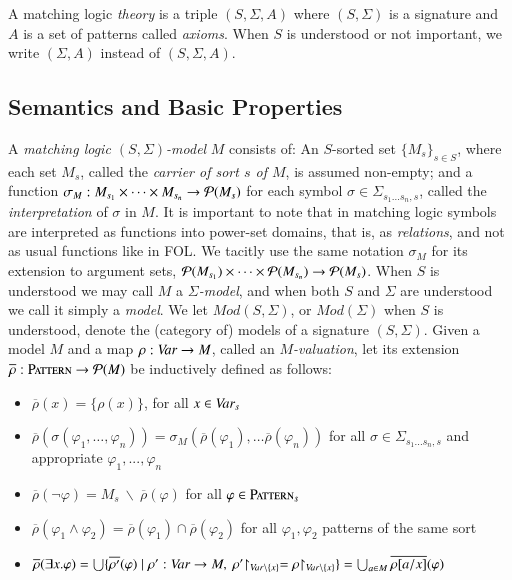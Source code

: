 \documentclass[UTF8,11pt]{article}
\theoremstyle{plain}
\theoremstyle{definition}
\theoremstyle{remark}
\newcommand{\Mod}{\textit{Mod}}
\newcommand{\Pattern}{\textsc{Pattern}\xspace}
\begin{document}
A matching logic \emph{theory} is a triple $(S, \Sigma, A)$ where
$(S,\Sigma)$ is a signature and $A$ is a set of patterns called \emph{axioms}.
When $S$ is understood or not important, we write $(\Sigma,A)$ instead of $(S,\Sigma,A)$.

\subsection{Semantics and Basic Properties}
\label{sec:semantics}

A \emph{matching logic $(S,\Sigma)$-model} $M$ consists of:
An $S$-sorted set $\{M_s\}_{s\in S}$, where each set $M_s$,
called the \emph{carrier of sort $s$ of $M$}, is assumed
non-empty; and a function
$\sigma_M:M_{s_1}\times\cdots\times M_{s_n} \rightarrow {\cal P}(M_s)$
for each symbol $\sigma\in\Sigma_{s_1\ldots s_n,s}$, called the
\emph{interpretation} of $\sigma$ in $M$.
It is important to note that in matching logic symbols are interpreted as
functions into power-set domains, that is, as \emph{relations}, and not as
usual functions like in FOL.
We tacitly use the same notation $\sigma_M$ for its extension
to argument sets,
${\cal P}(M_{s_1})\times\cdots\times {\cal P}(M_{s_n}) \rightarrow {\cal P}(M_s)$.
When $S$ is understood we may call $M$ a \emph{$\Sigma$-model}, and when
both $S$ and $\Sigma$ are understood we call it simply a \emph{model}.
We let $\Mod(S,\Sigma)$, or $\Mod(\Sigma)$ when $S$ is understood, denote
the (category of) models of a signature $(S,\Sigma)$.
%
Given a model $M$ and a map
$\rho:\textit{Var}\rightarrow M$, called an \emph{$M$-valuation}, let its extension
$\overline{\rho}:\Pattern\rightarrow{\cal P}(M)$
be inductively defined as follows:\vspace*{-2ex}
\begin{itemize}\itemsep-1ex
\item $\overline{\rho}(x) = \{\rho(x)\}$, for all $x\in\textit{Var}_s$
\item $\overline{\rho}(\sigma(\varphi_{1},\ldots,\varphi_{n}))=
\sigma_M(\overline{\rho}(\varphi_1),\ldots \overline{\rho}(\varphi_n))$ for all
$\sigma\in\Sigma_{s_1...s_n,s}$ and appropriate $\varphi_1,...,\varphi_n$
\item $\overline{\rho}(\neg\varphi) = M_s \ \backslash\ \overline{\rho}(\varphi)$ for all
$\varphi\in\Pattern_s$
\item $\overline{\rho}(\varphi_1 \wedge \varphi_2) =
\overline{\rho}(\varphi_1) \cap \overline{\rho}(\varphi_2)$
for all $\varphi_1, \varphi_2$ patterns of the same sort
\item $\overline{\rho}(\exists x . \varphi) =
\bigcup\{\overline{\rho'}(\varphi) \mid \rho':\textit{Var}\rightarrow M,\
\rho'\!\!\upharpoonright_{\textit{Var}\backslash\{x\}} =
\rho\!\!\upharpoonright_{\textit{Var}\backslash\{x\}}\}
= \bigcup_{a\in M} \overline{\rho[a/x]}(\varphi)
$
\end{itemize}\vspace*{-.5ex}
\end{document}
